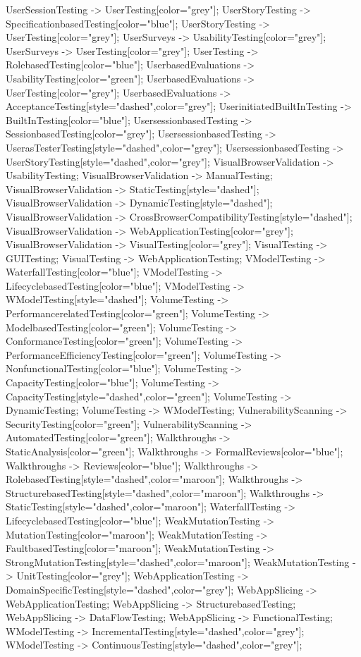 \documentclass{article}
\begin{document}
{UserSessionTesting -> UserTesting[color="grey"];
UserStoryTesting -> SpecificationbasedTesting[color="blue"];
UserStoryTesting -> UserTesting[color="grey"];
UserSurveys -> UsabilityTesting[color="grey"];
UserSurveys -> UserTesting[color="grey"];
UserTesting -> RolebasedTesting[color="blue"];
UserbasedEvaluations -> UsabilityTesting[color="green"];
UserbasedEvaluations -> UserTesting[color="grey"];
UserbasedEvaluations -> AcceptanceTesting[style="dashed",color="grey"];
UserinitiatedBuiltInTesting -> BuiltInTesting[color="blue"];
UsersessionbasedTesting -> SessionbasedTesting[color="grey"];
UsersessionbasedTesting -> UserasTesterTesting[style="dashed",color="grey"];
UsersessionbasedTesting -> UserStoryTesting[style="dashed",color="grey"];
VisualBrowserValidation -> UsabilityTesting;
VisualBrowserValidation -> ManualTesting;
VisualBrowserValidation -> StaticTesting[style="dashed"];
VisualBrowserValidation -> DynamicTesting[style="dashed"];
VisualBrowserValidation -> CrossBrowserCompatibilityTesting[style="dashed"];
VisualBrowserValidation -> WebApplicationTesting[color="grey"];
VisualBrowserValidation -> VisualTesting[color="grey"];
VisualTesting -> GUITesting;
VisualTesting -> WebApplicationTesting;
VModelTesting -> WaterfallTesting[color="blue"];
VModelTesting -> LifecyclebasedTesting[color="blue"];
VModelTesting -> WModelTesting[style="dashed"];
VolumeTesting -> PerformancerelatedTesting[color="green"];
VolumeTesting -> ModelbasedTesting[color="green"];
VolumeTesting -> ConformanceTesting[color="green"];
VolumeTesting -> PerformanceEfficiencyTesting[color="green"];
VolumeTesting -> NonfunctionalTesting[color="blue"];
VolumeTesting -> CapacityTesting[color="blue"];
VolumeTesting -> CapacityTesting[style="dashed",color="green"];
VolumeTesting -> DynamicTesting;
VolumeTesting -> WModelTesting;
VulnerabilityScanning -> SecurityTesting[color="green"];
VulnerabilityScanning -> AutomatedTesting[color="green"];
Walkthroughs -> StaticAnalysis[color="green"];
Walkthroughs -> FormalReviews[color="blue"];
Walkthroughs -> Reviews[color="blue"];
Walkthroughs -> RolebasedTesting[style="dashed",color="maroon"];
Walkthroughs -> StructurebasedTesting[style="dashed",color="maroon"];
Walkthroughs -> StaticTesting[style="dashed",color="maroon"];
WaterfallTesting -> LifecyclebasedTesting[color="blue"];
WeakMutationTesting -> MutationTesting[color="maroon"];
WeakMutationTesting -> FaultbasedTesting[color="maroon"];
WeakMutationTesting -> StrongMutationTesting[style="dashed",color="maroon"];
WeakMutationTesting -> UnitTesting[color="grey"];
WebApplicationTesting -> DomainSpecificTesting[style="dashed",color="grey"];
WebAppSlicing -> WebApplicationTesting;
WebAppSlicing -> StructurebasedTesting;
WebAppSlicing -> DataFlowTesting;
WebAppSlicing -> FunctionalTesting;
WModelTesting -> IncrementalTesting[style="dashed",color="grey"];
WModelTesting -> ContinuousTesting[style="dashed",color="grey"];

}
\end{document}
